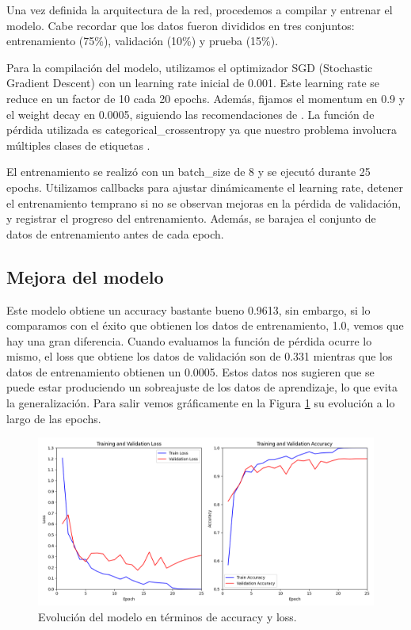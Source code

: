 Una vez definida la arquitectura de la red, procedemos a compilar y entrenar el modelo. Cabe recordar que los datos fueron divididos en tres conjuntos: entrenamiento (75\%), validación (10\%) y prueba (15\%). 

Para la compilación del modelo, utilizamos el optimizador SGD (Stochastic Gradient Descent) con un learning rate inicial de 0.001. Este learning rate se reduce en un factor de 10 cada 20 epochs. Además, fijamos el momentum en 0.9 y el weight decay en 0.0005, siguiendo las recomendaciones de \citep{kalash2018malware}. La función de pérdida utilizada es categorical\_crossentropy ya que nuestro problema involucra múltiples clases de etiquetas \citep{categoriCE}.

El entrenamiento se realizó con un batch\_size de 8 y se ejecutó durante 25 epochs. Utilizamos callbacks para ajustar dinámicamente el learning rate, detener el entrenamiento temprano si no se observan mejoras en la pérdida de validación, y registrar el progreso del entrenamiento. Además, se barajea el conjunto de datos de entrenamiento antes de cada epoch. 


\subsection{Mejora del modelo}

Este modelo obtiene un accuracy bastante bueno 0.9613, sin embargo, si lo comparamos con el éxito que obtienen los datos de entrenamiento, 1.0, vemos que hay una gran diferencia. Cuando evaluamos la función de pérdida ocurre lo mismo, el loss que obtiene los datos de validación son de 0.331 mientras que los datos de entrenamiento obtienen un 0.0005. Estos datos nos sugieren que se puede estar produciendo un sobreajuste de los datos de aprendizaje, lo que evita la generalización. Para salir vemos gráficamente en la Figura \ref{img: dropout0} su evolución a lo largo de las epochs.

\begin{figure}[h]
    \begin{center}
    \includegraphics[width=\textwidth]{img/malware_classifier_dropout0.png}
    \end{center}
    \caption{Evolución del modelo en términos de accuracy y loss.}
    \label{img: dropout0}
\end{figure}

